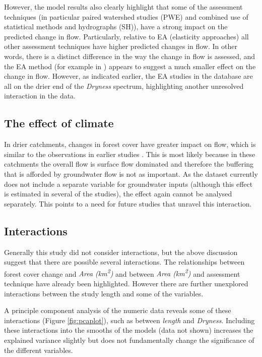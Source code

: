 \documentclass[]{elsarticle} %
\begin{document}
However, the model results also clearly highlight that some of the assessment techniques (in particular paired watershed studies (PWE) and combined use of statistical methods and hydrographs (SH)), have a strong impact on the predicted change in flow. Particularly, relative to EA (elasticity approaches) all other assessment techniques have higher predicted changes in flow. In other words, there is a distinct difference in the way the change in flow is assessed, and the EA method (for example in \citet{zhou2015}) appears to suggest a much smaller effect on the change in flow. However, as indicated earlier, the EA studies in the database are all on the drier end of the \emph{Dryness} spectrum, highlighting another unresolved interaction in the data.

\hypertarget{the-effect-of-climate}{%
\subsection{The effect of climate}\label{the-effect-of-climate}}

In drier catchments, changes in forest cover have greater impact on flow, which is similar to the observations in earlier studies \citep{zhang2017, zhou2015, filoso2017}. This is most likely because in these catchments the overall flow is surface flow dominated and therefore the buffering that is afforded by groundwater flow is not as important. As the dataset currently does not include a separate variable for groundwater inputs (although this effect is estimated in several of the studies), the effect again cannot be analysed separately. This points to a need for future studies that unravel this interaction.

\hypertarget{interactions}{%
\subsection{Interactions}\label{interactions}}

Generally this study did not consider interactions, but the above discussion suggest that there are possible several interactions. The relationships between forest cover change and \emph{Area (km\textsuperscript{2})} and between \emph{Area (km\textsuperscript{2})} and assessment technique have already been highlighted. However there are further unexplored interactions between the study length and some of the variables.

A principle component analysis of the numeric data reveals some of these interactions (Figure \ref{fig:pcaplot}), such as between \emph{length} and \emph{Dryness}. Including these interactions into the smooths of the models (data not shown) increases the explained variance slightly but does not fundamentally change the significance of the different variables.
\end{document}
